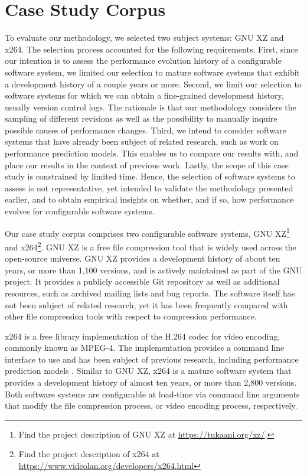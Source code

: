 \section{Case Study Corpus}\label{sec:casestudy}
To evaluate our methodology, we selected two subject systems: GNU XZ and
x264. The selection process accounted for the following requirements. First,
since our intention is to assess the performance evolution history of a
configurable software system, we limited our selection to mature software
systems that exhibit a development history of a couple years or more. Second,
we limit our selection to software systems for which we can obtain a
fine-grained development history, usually version control logs. The rationale is
that our methodology considers the sampling of different revisions as well as the possibility to manually inquire possible causes of performance
changes. Third, we intend to consider software systems that have already been
subject of related research, such as work on performance prediction models.
This enables us to compare our results with, and place our results in the
context of previous work. Lastly, the scope of this case study is constrained
by limited time. Hence, the selection of software systems to assess is not
representative, yet intended to validate the methodology presented earlier, and
to obtain empirical insights on whether, and if so, how performance evolves for
configurable software systems.

Our case study corpus comprises two configurable software systems, GNU
XZ\footnote{Find the project description of GNU XZ at
\url{https://tukaani.org/xz/}.} and x264\footnote{Find the project description
of x264 at \url{https://www.videolan.org/developers/x264.html}}.
GNU XZ is a free file compression tool that is widely used across the open-source universe. GNU XZ provides a development history of about ten years,
or more than 1,100 versions,  and is actively maintained as part of the GNU
project. It provides a publicly accessible Git repository as well as additional
resources, such as archived mailing lists and bug reports. The software itself
has not been subject of related research, yet it has been frequently compared
with other file compression tools with respect to compression performance. 

x264 is a free library implementation of the H.264 codec for video encoding,
commonly known as MPEG-4. The implementation provides a command line interface
to use and has been subject of previous research, including performance
prediction models
\citep{siegmund_predicting_2012,siegmund_performance-influence_2015}. Similar to
GNU XZ, x264 is a mature software system that provides a development history of almost ten years, or more than 2,800 versions. Both software systems are configurable at load-time
via command line arguments that modify the file compression process, or video
encoding process, respectively.

